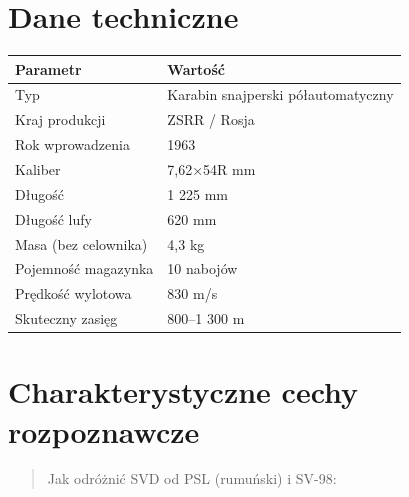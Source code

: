 \documentclass[12pt,openany,oneside]{book}
\begin{document}
\section{Dane techniczne}\label{dane-techniczne-62}

\begin{longtable}[]{@{}ll@{}}
\toprule\noalign{}
Parametr & Wartość \\
\midrule\noalign{}
\endhead
\bottomrule\noalign{}
\endlastfoot
Typ & Karabin snajperski półautomatyczny \\
Kraj produkcji & ZSRR / Rosja \\
Rok wprowadzenia & 1963 \\
Kaliber & 7,62×54R mm \\
Długość & 1 225 mm \\
Długość lufy & 620 mm \\
Masa (bez celownika) & 4,3 kg \\
Pojemność magazynka & 10 nabojów \\
Prędkość wylotowa & 830 m/s \\
Skuteczny zasięg & 800--1 300 m \\
\end{longtable}

\section{Charakterystyczne cechy
rozpoznawcze}\label{charakterystyczne-cechy-rozpoznawcze-62}

\begin{quote}
Jak odróżnić SVD od PSL (rumuński) i SV-98:
\end{quote}
\end{document}
